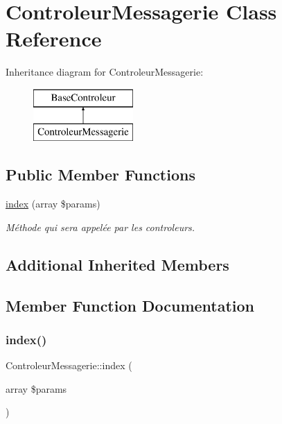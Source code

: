 \hypertarget{class_controleur_messagerie}{}\section{Controleur\+Messagerie Class Reference}
\label{class_controleur_messagerie}
Inheritance diagram for Controleur\+Messagerie\+:\begin{figure}[H]
\begin{center}
\leavevmode
\includegraphics[height=2.000000cm]{class_controleur_messagerie}
\end{center}
\end{figure}
\subsection*{Public Member Functions}
\begin{DoxyCompactItemize}
\item 
\hyperlink{class_controleur_messagerie_a8e5cf51289680162c9f1514673db643d}{index} (array \$params)
\begin{DoxyCompactList}\small\item\em Méthode qui sera appelée par les controleurs. \end{DoxyCompactList}\end{DoxyCompactItemize}
\subsection*{Additional Inherited Members}


\subsection{Member Function Documentation}
\mbox{\label{class_controleur_messagerie_a8e5cf51289680162c9f1514673db643d}} 
\subsubsection{\texorpdfstring{index()}{index()}}
{\footnotesize\ttfamily Controleur\+Messagerie\+::index (\begin{DoxyParamCaption}\item[{array}]{\$params }\end{DoxyParamCaption})}



